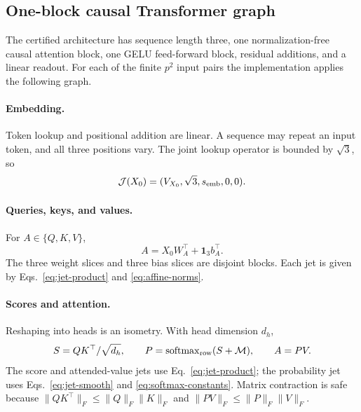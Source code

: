 \subsection{One-block causal Transformer graph}

The certified architecture has sequence length three, one normalization-free
causal attention block, one GELU feed-forward block, residual additions, and a
linear readout.  For each of the finite $p^2$ input pairs the implementation
applies the following graph.

\paragraph{Embedding.}
Token lookup and positional addition are linear.  A sequence may repeat an
input token, and all three positions vary.  The joint lookup operator is
bounded by $\sqrt3$, so
\begin{equation}
 \mathcal J(X_0)=(V_{X_0},\sqrt3,s_{\rm emb},0,0).
\end{equation}

\paragraph{Queries, keys, and values.}
For $A\in\{Q,K,V\}$,
\begin{equation}
 A=X_0W_A^\top+\mathbf1_3b_A^\top.
\end{equation}
The three weight slices and three bias slices are disjoint blocks.  Each jet is
given by Eqs.~\eqref{eq:jet-product} and \eqref{eq:affine-norms}.

\paragraph{Scores and attention.}
Reshaping into heads is an isometry.  With head dimension $d_h$,
\begin{equation}
 S=QK^\top/\sqrt{d_h},\qquad P=\operatorname{softmax}_{\rm row}(S+\mathcal M),
 \qquad A=PV.
\end{equation}
The score and attended-value jets use Eq.~\eqref{eq:jet-product}; the
probability jet uses Eqs.~\eqref{eq:jet-smooth} and
\eqref{eq:softmax-constants}.  Matrix contraction is safe because
$\lVert QK^\top\rVert_F\le\lVert Q\rVert_F\lVert K\rVert_F$ and
$\lVert PV\rVert_F\le\lVert P\rVert_F\lVert V\rVert_F$.

